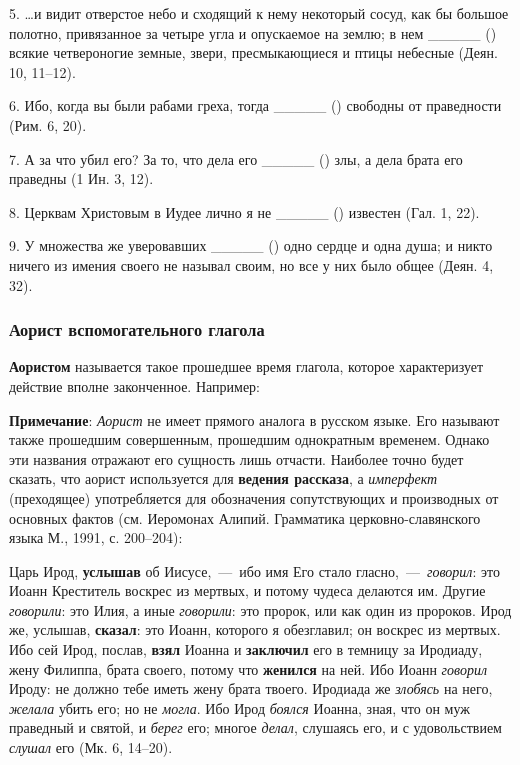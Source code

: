\documentclass[11pt,a4paper,oneside]{memoir}
\newcommand{\hspca}{\hspace{2.4em}}
\begin{document}
    5. \ldots и видит отверстое небо и сходящий к нему некоторый сосуд, как бы большое полотно, привязанное за четыре угла и опускаемое на землю; в нем _____ ({}) всякие четвероногие земные, звери, пресмыкающиеся и птицы небесные (Деян. 10, 11--12).
    
    6. Ибо, когда вы были рабами греха, тогда _____ ({}) свободны от праведности (Рим. 6, 20).
    
    7. А за что убил его? За то, что дела его _____ ({}) злы, а дела брата его праведны (1 Ин. 3, 12).
    
    8. Церквам Христовым в Иудее лично я не _____ ({}) известен (Гал. 1, 22).
    
    9. У множества же уверовавших _____ ({}) одно сердце и одна душа; и никто ничего из имения своего не называл своим, но все у них было общее (Деян. 4, 32).

                \subsubsection{Аорист вспомогательного глагола {}}

    \textbf{Аористом} называется такое прошедшее время глагола, которое характеризует действие вполне законченное. Например:
    
    
    \bigskip\autorows{l}{1}{l}{
        \hspca{{\slv{То́й речѐ и҆}} {\slv{\large бы́ша}} (Пс. 32, 9)}
    }

    \textbf{Примечание}: \emph{Аорист} не имеет прямого аналога в русском языке. Его называют также прошедшим совершенным, прошедшим однократным временем. Однако эти названия отражают его сущность лишь отчасти. Наиболее точно будет сказать, что аорист используется для \textbf{ведения рассказа}, а \emph{имперфект} (преходящее) употребляется для обозначения сопутствующих и производных от основных фактов (см. Иеромонах Алипий. Грамматика церковно-славянского языка М., 1991, с. 200--204):
    
    Царь Ирод, \textbf{услышав} об Иисусе,~---~ибо имя Его стало гласно,~---~\emph{говорил}: это Иоанн Креститель воскрес из мертвых, и потому чудеса делаются им. Другие \emph{говорили}: это Илия, а иные \emph{говорили}: это пророк, или как один из пророков. Ирод же, услышав, \textbf{сказал}: это Иоанн, которого я обезглавил; он воскрес из мертвых. Ибо сей Ирод, послав, \textbf{взял} Иоанна и \textbf{заключил} его в темницу за Иродиаду, жену Филиппа, брата своего, потому что \textbf{женился} на ней. Ибо Иоанн \emph{говорил} Ироду: не должно тебе иметь жену брата твоего. Иродиада же \emph{злобясь} на него, \emph{желала} убить его; но не \emph{могла}. Ибо Ирод \emph{боялся} Иоанна, зная, что он муж праведный и святой, и \emph{берег} его; многое \emph{делал}, слушаясь его, и с удовольствием \emph{слушал} его (Мк. 6, 14--20).
    
\end{document}
